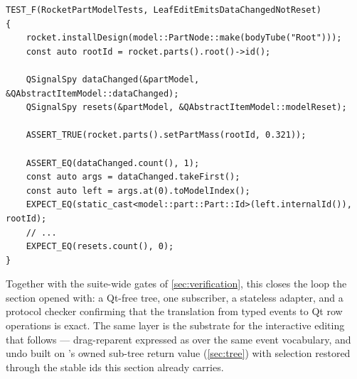 \begin{listing}[htbp]
\begin{verbatim}
TEST_F(RocketPartModelTests, LeafEditEmitsDataChangedNotReset)
{
    rocket.installDesign(model::PartNode::make(bodyTube("Root")));
    const auto rootId = rocket.parts().root()->id();

    QSignalSpy dataChanged(&partModel, &QAbstractItemModel::dataChanged);
    QSignalSpy resets(&partModel, &QAbstractItemModel::modelReset);

    ASSERT_TRUE(rocket.parts().setPartMass(rootId, 0.321));

    ASSERT_EQ(dataChanged.count(), 1);
    const auto args = dataChanged.takeFirst();
    const auto left = args.at(0).toModelIndex();
    EXPECT_EQ(static_cast<model::part::Part::Id>(left.internalId()), rootId);
    // ...
    EXPECT_EQ(resets.count(), 0);
}
\end{verbatim}
\caption{A routed mass edit reaches the view as exactly one  on the right node
--- and zero resets ().}\label{lst:gui-testpin}
\end{listing}

Together with the suite-wide gates of \cref{sec:verification}, this closes the loop the section
opened with: a Qt-free tree, one subscriber, a stateless adapter, and a protocol checker
confirming that the translation from typed events to Qt row operations is exact. The same layer
is the substrate for the interactive editing that follows --- drag-reparent expressed as
 over the same event vocabulary, and undo built on 's owned
sub-tree return value (\cref{sec:tree}) with selection restored through the stable ids this
section already carries.
